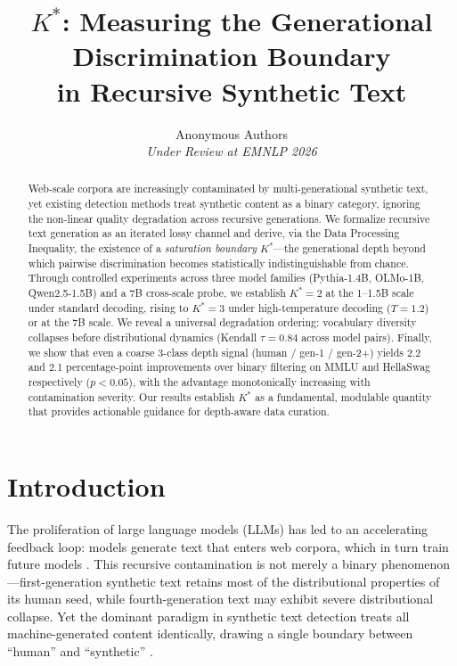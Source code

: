 \documentclass[11pt,a4paper]{article}
\title{$K^*$: Measuring the Generational Discrimination Boundary\\in Recursive Synthetic Text}
\author{
  Anonymous Authors\\
  \textit{Under Review at EMNLP 2026}
}
\date{}
\begin{document}
\maketitle

\begin{abstract}
Web-scale corpora are increasingly contaminated by multi-generational synthetic text, yet existing detection methods treat synthetic content as a binary category, ignoring the non-linear quality degradation across recursive generations. We formalize recursive text generation as an iterated lossy channel and derive, via the Data Processing Inequality, the existence of a \emph{saturation boundary} $K^*$---the generational depth beyond which pairwise discrimination becomes statistically indistinguishable from chance. Through controlled experiments across three model families (Pythia-1.4B, OLMo-1B, Qwen2.5-1.5B) and a 7B cross-scale probe, we establish $K^*{=}2$ at the 1--1.5B scale under standard decoding, rising to $K^*{=}3$ under high-temperature decoding ($T{=}1.2$) or at the 7B scale. We reveal a universal degradation ordering: vocabulary diversity collapses before distributional dynamics (Kendall $\tau{=}0.84$ across model pairs). Finally, we show that even a coarse 3-class depth signal (human / gen-1 / gen-2+) yields 2.2 and 2.1 percentage-point improvements over binary filtering on MMLU and HellaSwag respectively ($p{<}0.05$), with the advantage monotonically increasing with contamination severity. Our results establish $K^*$ as a fundamental, modulable quantity that provides actionable guidance for depth-aware data curation.
\end{abstract}

\section{Introduction}
\label{sec:intro}

The proliferation of large language models (LLMs) has led to an accelerating feedback loop: models generate text that enters web corpora, which in turn train future models \citep{shumailov2024model}. This recursive contamination is not merely a binary phenomenon---first-generation synthetic text retains most of the distributional properties of its human seed, while fourth-generation text may exhibit severe distributional collapse. Yet the dominant paradigm in synthetic text detection treats all machine-generated content identically, drawing a single boundary between ``human'' and ``synthetic'' \citep{mitchell2023detectgpt,hans2024binoculars}.
\end{document}
